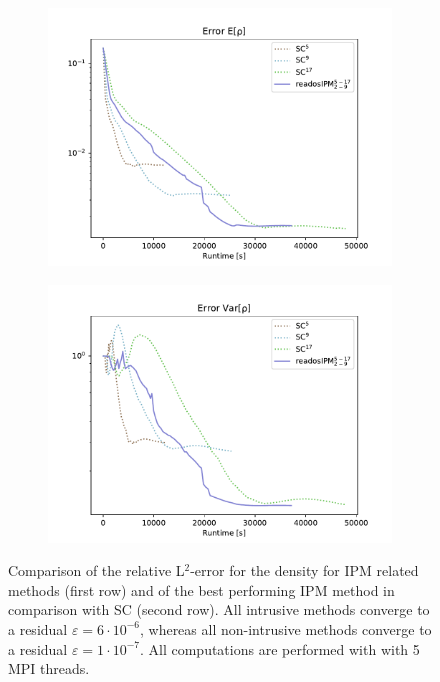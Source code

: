 \begin{figure}[h!]
	\begin{subfigure}{0.5\linewidth}
		\centering
				\includegraphics[scale=0.55]{figs/errorEuler/L2_error_E[rho]_sc.pdf}
		\caption{}
		\label{fig:sub33}
	\end{subfigure}%
	\begin{subfigure}{0.5\linewidth}
		\centering
				\includegraphics[scale=0.55]{figs/errorEuler/L2_error_Var[rho]_sc.pdf}
		\caption{}
		\label{fig:sub34}
	\end{subfigure}
	\caption{Comparison of the relative L$^2$-error for the density for IPM related methods (first row) and of the best performing IPM method in comparison with SC (second row). All intrusive methods converge to a residual $\varepsilon=6\cdot 10^{-6}$, whereas all non-intrusive methods converge to a residual $\varepsilon=1\cdot 10^{-7}$. All computations are performed with with 5 MPI threads.}
	\label{fig:L2ErrorSolution}
\end{figure}
